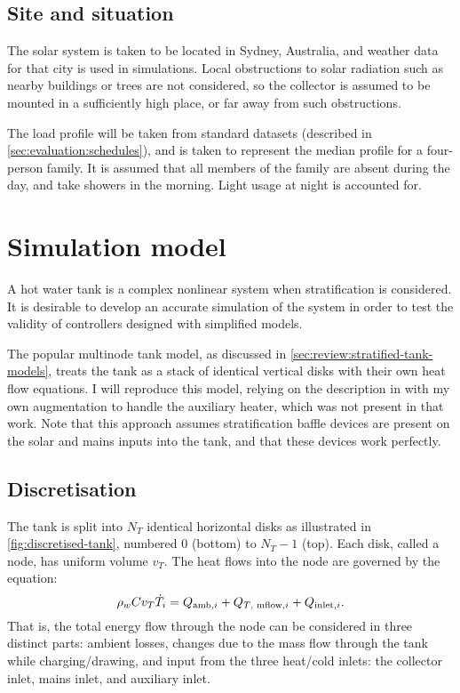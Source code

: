 \subsection{Site and situation}

The solar system is taken to be located in Sydney, Australia, and weather data for that city is used in simulations.
Local obstructions to solar radiation such as nearby buildings or trees are not considered, so the collector is assumed to be mounted in a sufficiently high place, or far away from such obstructions.

The load profile will be taken from standard datasets (described in \autoref{sec:evaluation:schedules}), and is taken to represent the median profile for a four-person family.
It is assumed that all members of the family are absent during the day, and take showers in the morning.
Light usage at night is accounted for.

\section{Simulation model}
\label{sec:models:simulation}

A hot water tank is a complex nonlinear system when stratification is considered.
It is desirable to develop an accurate simulation of the system in order to test the validity of controllers designed with simplified models.

The popular multinode tank model, as discussed in \autoref{sec:review:stratified-tank-models}, treats the tank as a stack of identical vertical disks with their own heat flow equations.
I will reproduce this model, relying on the description in \textcite{Cristofari02} with my own augmentation to handle the auxiliary heater, which was not present in that work.
Note that this approach assumes stratification baffle devices are present on the solar and mains inputs into the tank, and that these devices work perfectly.

\subsection{Discretisation}

The tank is split into $N_T$ identical horizontal disks as illustrated in \autoref{fig:discretised-tank}, numbered $0$ (bottom) to $N_T-1$ (top).
Each disk, called a node, has uniform volume $v_T$.
The heat flows into the node are governed by the equation:
\begin{equation}
   \label{eq:tank-node-dT}
   \rho_w C v_T \dot{T}_i = Q_{\text{amb}, i} + Q_{\text{$T$, mflow}, i} + Q_{\text{inlet}, i}.
\end{equation}
That is, the total energy flow through the node can be considered in three distinct parts: ambient losses, changes due to the mass flow through the tank while charging/drawing, and input from the three heat/cold inlets: the collector inlet, mains inlet, and auxiliary inlet.

